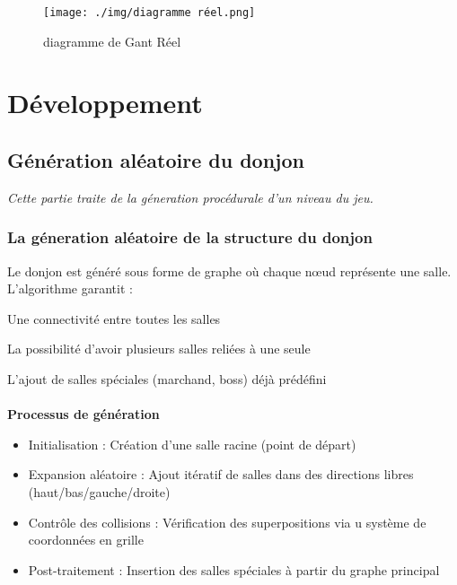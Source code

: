 \documentclass[a4paper,11pt]{article}
\begin{document}
\begin{figure}[ht]
\centering
\texttt{[image: ./img/diagramme réel.png]}
\caption{diagramme de Gant Réel}
\label{fig:map_gen32}
\end{figure}
\bigskip





\newpage
\section{Développement}

\subsection{Génération aléatoire du donjon}
\textit{Cette partie traite de la géneration procédurale d'un niveau du jeu.}
\subsubsection{La géneration aléatoire de la structure du donjon}

Le donjon est généré sous forme de graphe où chaque nœud représente une salle. L'algorithme garantit :

    Une connectivité entre toutes les salles

    La possibilité d'avoir plusieurs salles reliées à une seule

    L'ajout de salles spéciales (marchand, boss) déjà prédéfini 
\\\\
\textbf{Processus de génération}
\begin{itemize}
    \item Initialisation : Création d'une salle racine (point de départ)
    \item Expansion aléatoire : Ajout itératif de salles dans des directions libres (haut/bas/gauche/droite)
    \item Contrôle des collisions : Vérification des superpositions via u système de coordonnées en grille
    \item Post-traitement : Insertion des salles spéciales à partir du graphe principal
\end{itemize}
\end{document}
